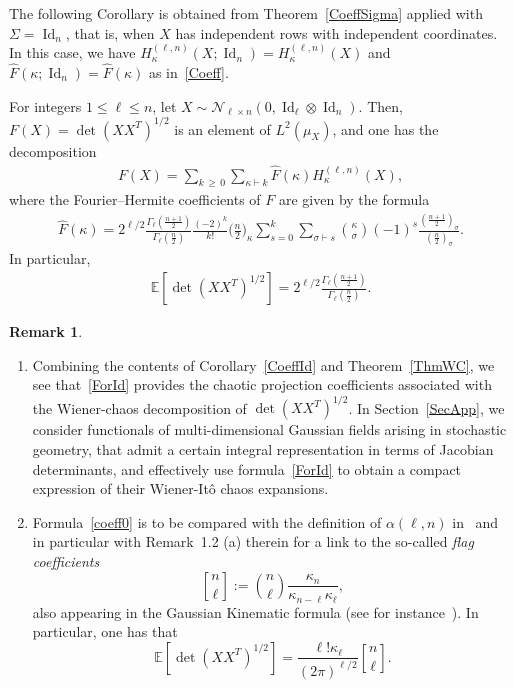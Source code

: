 \documentclass[10pt]{amsart}
\theoremstyle{definition}\newtheorem{defi}[theo]{Definition}\newtheorem{rema}[theo]{Remark}\newtheorem{exam}[theo]{Example}\newtheorem{exem}[theo]{Example}\newtheorem{nota}[theo]{Notation}
\DeclareMathOperator{\Id}{Id}
\newcommand{\scN}{\mathscr{N}}
\newcommand{\E}[1]{\mathbb{E}\left[#1\right]}
\newcommand*{\alphenumi}{\renewcommand*{\theenumi}{\alph{enumi}}}
\newcommand*{\kbinom}[2]{\genfrac{[}{]}{0pt}{}{#1}{#2}}
\begin{document}
The following Corollary is obtained from Theorem~\ref{CoeffSigma} applied with $\Sigma=\Id_{n}$, that is, when $X$ has independent rows with independent coordinates. In this case, we have $H_{\kappa}^{(\ell,n)}(X;\Id_n)=H_{\kappa}^{(\ell,n)}(X)$ and $\widehat{F}(\kappa;\Id_n)=\widehat{F}(\kappa)$ as in~\eqref{Coeff}.
\begin{coro}\label{CoeffId}
For integers $1\leq \ell \leq n$, let $X \sim \scN_{\ell \times n}(0,\Id_{\ell}\otimes \Id_n)$. Then, $F(X)=\det(XX^T)^{1/2}$ is an element of $L^2(\mu_X)$, and one has the decomposition
\begin{gather*}
F(X)= \sum_{k\,\geq\,0} \sum_{\kappa\vdash k} \widehat{F}(\kappa) H_{\kappa}^{(\ell,n)}(X),
\end{gather*}
where the Fourier--Hermite coefficients of $F$ are given by the formula
\begin{gather}\label{ForId}
\widehat{F}(\kappa) = 2^{\ell/2} \frac{\Gamma_{\ell}\left(\frac{n+1}{2}\right)}{\Gamma_{\ell}\left(\frac{n}{2}\right)} \frac{ (-2)^{k} }{ k!}\bigg(\frac{n}{2}\bigg)_{\kappa}
\sum_{s=0}^{k} \sum_{\sigma\vdash s} \binom{\kappa}{\sigma} (-1)^s\frac{\left(\frac{n+1}{2}\right)_{\sigma}}{\left(\frac{n}{2}\right)_{\sigma}}.
\end{gather}
In particular,
\begin{gather}\label{coeff0}
\E{\det\left(XX^T\right)^{1/2}}= 2^{\ell/2}\frac{\Gamma_{\ell}\left(\frac{n+1}{2}\right)}{\Gamma_{\ell}\left(\frac{n}{2}\right)}.
\end{gather}
\end{coro}

\begin{rema}\leavevmode
\begin{enumerate}\alphenumi
\item Combining the contents of Corollary~\ref{CoeffId} and Theorem~\ref{ThmWC}, we see that~\eqref{ForId} provides the chaotic projection coefficients associated with the Wiener-chaos decomposition of $\det(XX^T)^{1/2}$. In Section~\ref{SecApp}, we consider functionals of multi-dimensional Gaussian fields arising in stochastic geometry, that admit a certain integral representation in terms of Jacobian determinants, and effectively use formula~\eqref{ForId} to obtain a compact expression of their Wiener-Itô chaos expansions.
\item Formula~\eqref{coeff0} is to be compared with the definition of $\alpha(\ell,n)$ in~\cite[Eq.~(1.8)]{Not20} and in particular with Remark~1.2 (a) therein for a link to the so-called \emph{flag coefficients}
\[
\kbinom{ n}{\ell}:=\binom{n}{\ell} \frac{\kappa_{n}}{\kappa_{n-\ell}\kappa_{\ell}},
\]
also appearing in the Gaussian Kinematic formula (see for instance~\cite[Chapter~13]{AT09}). In particular, one has that
\[
\E{\det\left(XX^T\right)^{1/2}} = \frac{\ell! \kappa_{\ell}}{(2\pi)^{\ell/2}} \kbinom{ n}{\ell}.
\]
\end{enumerate}
\end{rema}
\end{document}
